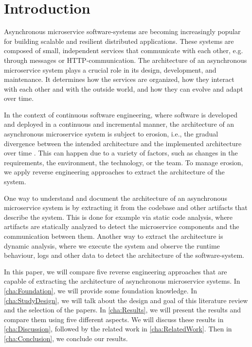
\section{Introduction}
\label{cha:Introduction}
Asynchronous microservice software-systems are becoming increasingly popular for building scalable and resilient distributed applications.
These systems are composed of small, independent services that communicate with each other, e.g. through messages or HTTP-communication.
The architecture of an asynchronous microservice system plays a crucial role in its design, development, and maintenance.
It determines how the services are organized, how they interact with each other and with the outside world, and how they can evolve and adapt over time.

In the context of continuous software engineering, where software is developed and deployed in a continuous and incremental manner, the architecture of an asynchronous microservice system is subject to erosion, i.e., the gradual divergence between the intended architecture and the implemented architecture over time \cite{DESILVA2012132}.
This can happen due to a variety of factors, such as changes in the requirements, the environment, the technology, or the team.
To manage erosion, we apply reverse engineering approaches to extract the architecture of the system.

One way to understand and document the architecture of an asynchronous microservice system is by extracting it from the codebase and other artifacts that describe the system.
This is done for example via static code analysis, where artifacts are statically analyzed to detect the microservice components and the communication between them.
Another way to extract the architecture is dynamic analysis, where we execute the system and observe the runtime behaviour, logs and other data to detect the architecture of the software-system.

In this paper, we will compare five reverse engineering approaches that are capable of extracting the architecture of asynchronous microservice systems.
In \autoref{cha:Foundation}, we will provide some foundation knowledge.
In \autoref{cha:StudyDesign}, we will talk about the design and goal of this literature review and the selection of the papers.
In \autoref{cha:Results}, we will present the results and compare them using five different aspects.
We will discuss these results in \autoref{cha:Discussion}, followed by the related work in \autoref{cha:RelatedWork}.
Then in \autoref{cha:Conclusion}, we conclude our results.
